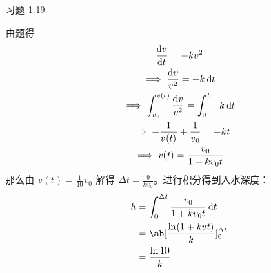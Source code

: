 \begin{problem}
    习题 1.19
    \begin{solution}
        由题得
        $$
        \begin{gathered}
            \dv{v}{t} = -k v^2 \\
            \implies \frac{\dd{v}}{v^2} = -k \dd{t} \\
            \implies \int_{v_0}^{v(t)} \frac{\dd{v}}{v^2} = \int_0^t -k \dd{t} \\
            \implies -\frac{1}{v(t)} + \frac{1}{v_0} = -k t \\
            \implies v(t) = \frac{v_0}{1 + k v_0 t}
        \end{gathered}
        $$
        那么由 $v(t) = \frac{1}{10} v_0$ 解得 $\Delta t = \frac{9}{k v_0}$。进行积分得到入水深度：
        $$
        \begin{aligned}
            h & = \int_0^{\Delta t} \frac{v_0}{1 + k v_0 t} \dd{t} \\
            & = \ab[\frac{\ln (1 + k v t)}{k}]_0^{\Delta t} \\
            & = \frac{\ln 10}{k}
        \end{aligned}
        $$
    \end{solution}
\end{problem}